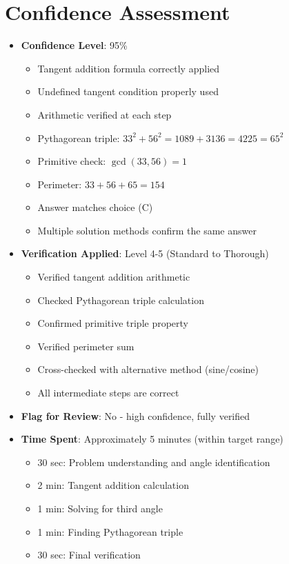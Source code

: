 \documentclass[12pt]{article}
\begin{document}
\section*{Confidence Assessment}
\begin{itemize}[leftmargin=*]
    \item \textbf{Confidence Level}: 95\%
    \begin{itemize}
        \item Tangent addition formula correctly applied
        \item Undefined tangent condition properly used
        \item Arithmetic verified at each step
        \item Pythagorean triple: $33^2 + 56^2 = 1089 + 3136 = 4225 = 65^2$ \checkmark
        \item Primitive check: $\gcd(33, 56) = 1$ \checkmark
        \item Perimeter: $33 + 56 + 65 = 154$ \checkmark
        \item Answer matches choice (C)
        \item Multiple solution methods confirm the same answer
    \end{itemize}
    
    \item \textbf{Verification Applied}: Level 4-5 (Standard to Thorough)
    \begin{itemize}
        \item Verified tangent addition arithmetic
        \item Checked Pythagorean triple calculation
        \item Confirmed primitive triple property
        \item Verified perimeter sum
        \item Cross-checked with alternative method (sine/cosine)
        \item All intermediate steps are correct
    \end{itemize}
    
    \item \textbf{Flag for Review}: No - high confidence, fully verified
    
    \item \textbf{Time Spent}: Approximately 5 minutes (within target range)
    \begin{itemize}
        \item 30 sec: Problem understanding and angle identification
        \item 2 min: Tangent addition calculation
        \item 1 min: Solving for third angle
        \item 1 min: Finding Pythagorean triple
        \item 30 sec: Final verification
    \end{itemize}
\end{itemize}
\end{document}
